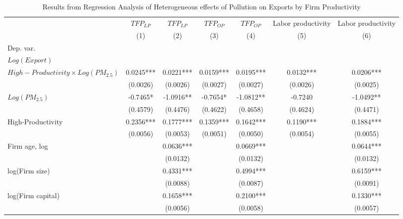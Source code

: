 \documentclass[12pt]{article}
\begin{document}
\begin{table}[H]\centering
  \caption{Results from Regression Analysis of Heterogeneous effects of Pollution on Exports by Firm Productivity}\label{tab:hetero_tfp}
  \resizebox{\textwidth}{!}
  {
  \begin{tabular}{l*{6}{c}}
    \hline\hline
    &\multicolumn{1}{c}{$TFP_{LP}$}&\multicolumn{1}{c}{$TFP_{LP}$}&\multicolumn{1}{c}{$TFP_{OP}$}&\multicolumn{1}{c}{$TFP_{OP}$}&\multicolumn{1}{c}{Labor productivity}&\multicolumn{1}{c}{Labor productivity}\\
    &\multicolumn{1}{c}{(1)}&\multicolumn{1}{c}{(2)}&\multicolumn{1}{c}{(3)}&\multicolumn{1}{c}{(4)}&\multicolumn{1}{c}{(5)}&\multicolumn{1}{c}{(6)}\\
    Dep. var. &&&\\
    $Log(Export)$ &&&\\
    \hline
    $High-Productivity \times Log(PM_{2.5})$     &0.0245***&0.0221***&0.0159***&0.0195***&0.0132***&0.0206***\\
                                                   &(0.0026)&(0.0026)  &(0.0027)&(0.0027)&(0.0026)&(0.0025)\\
    $Log(PM_{2.5})$                                & -0.7465*&-1.0916**&-0.7654*&-1.0812**&-0.7240&-1.0492**\\
                                                   &(0.4579)&(0.4476)  &(0.4622)&(0.4658)&(0.4624)&(0.4471) \\
   High-Productivity                            &0.2356***&0.1777***&0.1359***&0.1642***&0.1190***&0.1884***\\
                                                   &(0.0056)&(0.0053)  &(0.0051)&(0.0050)&(0.0054)&(0.0055)\\
    Firm age, log                                  &&0.0636*** && 0.0669***      &&0.0644***\\
                                                   &&(0.0132)   &&   (0.0132)    && (0.0132)\\
    log(Firm size)                                 &&0.4331***  &&  0.4994***    &&0.6159***\\
                                                   && (0.0088)  &&(0.0087)&&(0.0091)\\
    log(Firm capital)                              &&0.1658***   &&0.2100***&&0.1330***\\ 
                                                  &&(0.0056)    &&(0.0058)&&(0.0057)\\  
    \hline

\end{tabular}}
\end{table}
\end{document}
